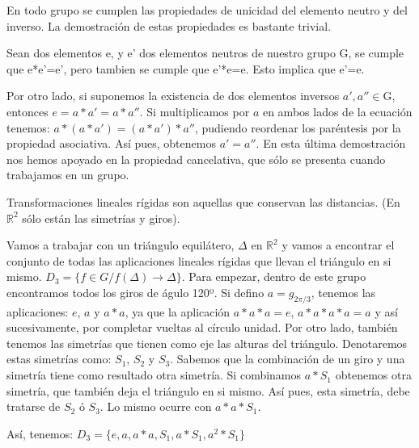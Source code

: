 \documentclass[a4paper,10pt]{apuntes}
\newenvironment{definition}[1][Definition]{\begin{trivlist}
\item[\hskip \labelsep {\bfseries #1}]}{\end{trivlist}}
\newenvironment{example}[1][Example]{\begin{trivlist}
\item[\hskip \labelsep {\bfseries #1}]}{\end{trivlist}}
\begin{document}
 En todo grupo se cumplen las propiedades de unicidad del elemento neutro y del inverso. La demostración de estas propiedades
 es bastante trivial.
 
 Sean dos elementos e, y e' dos elementos neutros de nuestro grupo G, se cumple que e*e'=e', pero tambien se cumple que e'*e=e. Esto 
 implica que e'=e.

 Por otro lado, si suponemos la existencia de dos elementos inversos $a',a''\in$G, entonces $e=a*a'=a*a''$. Si multiplicamos por $a$ en ambos lados de la ecuación tenemos: $a*(a*a')=(a*a')*a''$, pudiendo reordenar los paréntesis por la 
 propiedad asociativa. Así pues, obtenemos $a'=a''$.
 En esta última demostración nos hemos apoyado en la propiedad cancelativa, que sólo se presenta cuando trabajamos en un grupo.\\
  
 \begin{definition}
  Transformaciones lineales rígidas son aquellas que conservan las distancias. (En $\mathds{R}^{2}$  sólo están las simetrías y giros).\\
 \end{definition}
 
 \begin{example} 
  Vamos a trabajar con un triángulo equilátero, $\Delta$  en $\mathds{R}^{2}$  y vamos a encontrar el conjunto de todas las aplicaciones lineales rígidas 
  que llevan el triángulo en si mismo. $D_{3}=\{f\in G / f(\Delta)\longrightarrow\Delta\}$.
  Para empezar, dentro de este grupo encontramos todos los giros de águlo 120º. Si defino $a=g_{2\pi/3}$, tenemos las aplicaciones:
  $e$, $a$  y $a*a$, ya que la aplicación $a*a*a=e$, $a*a*a*a=a$  y así sucesivamente, por completar vueltas al círculo unidad.
  Por otro lado, también tenemos las simetrías que tienen como eje las alturas del triángulo. Denotaremos estas simetrías como: $S_{1}$, $S_{2}$  y $S_{3}$.
  Sabemos que la combinación de un giro y una simetría tiene como resultado otra simetría. Si combinamos $a*S_{1}$  obtenemos otra simetría, 
  que también deja el triángulo en si mismo. Así pues, esta simetría, debe tratarse de $S_{2}$  ó $S_{3}$. Lo mismo ocurre con $a*a*S_{1}$.
  
  Así, tenemos: $D_{3}=\{e, a, a*a, S_{1}, a*S_{1}, a^{2}*S_{1}\}$
 \end{example}
\end{document}
